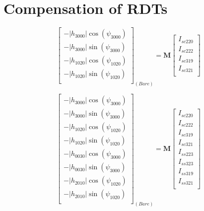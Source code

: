 \section{Compensation of RDTs}

\begin{equation}
    \begin{bmatrix}
        -|{h_{3000}}|  \cos (\psi_{3000})\\
        -|{h_{3000}}|  \sin (\psi_{3000})\\
        -|{h_{1020}}|  \cos (\psi_{1020})\\
        -|{h_{1020}}|  \sin (\psi_{1020})\\
      \end{bmatrix}_{(Bare)}
    =
      \boldsymbol{M}
    \begin{bmatrix}
        I_{sc220} \\
        I_{sc222} \\
        I_{sc319} \\
        I_{sc321} \\
      \end{bmatrix}
\end{equation}

\begin{equation}
    \begin{bmatrix}
        -|{h_{3000}}|  \cos (\psi_{3000})\\
        -|{h_{3000}}|  \sin (\psi_{3000})\\
        -|{h_{1020}}|  \cos (\psi_{1020})\\
        -|{h_{1020}}|  \sin (\psi_{1020})\\
        -|{h_{0030}}|  \cos (\psi_{3000})\\
        -|{h_{0030}}|  \sin (\psi_{3000})\\
        -|{h_{2010}}|  \cos (\psi_{1020})\\
        -|{h_{2010}}|  \sin (\psi_{1020})\\
      \end{bmatrix}_{(Bare)}
    =
      \boldsymbol{M}
    \begin{bmatrix}
        I_{sc220} \\
        I_{sc222} \\
        I_{sc319} \\
        I_{sc321} \\
        I_{ss223} \\
        I_{ss323} \\
        I_{ss319} \\
        I_{ss321} \\
      \end{bmatrix}
\end{equation}
 
